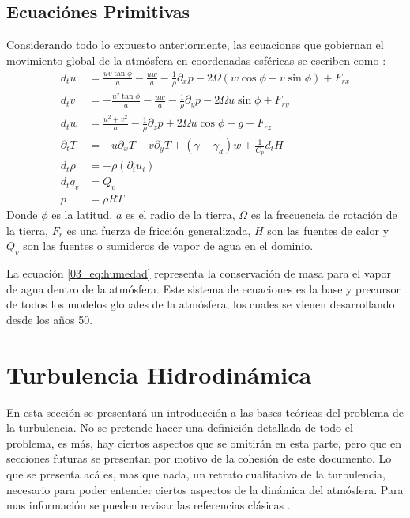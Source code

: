 \subsection{Ecuaciónes Primitivas}
Considerando todo lo expuesto anteriormente, las ecuaciones que gobiernan el movimiento global de la atmósfera en coordenadas esféricas se escriben como \cite{warner2010numerical}:
\begin{align}
d_t u &= \frac{uv\tan\phi}{a}-\frac{uw}{a}-\frac{1}{\rho}\partial_x p - 2\Omega(w\cos\phi - v\sin\phi) + F_{rx}\\
d_t v &= -\frac{u^2\tan\phi}{a}-\frac{uw}{a}-\frac{1}{\rho}\partial_y p - 2\Omega u\sin\phi + F_{ry}\\
d_t w &= \frac{u^2 + v^2}{a}-\frac{1}{\rho}\partial_z p + 2\Omega u\cos\phi -g + F_{rz}\\
\partial_t T &= -u\partial_x T -v\partial_y T + (\gamma-\gamma_d)w+\frac{1}{C_p}d_t H\\
d_t \rho &= -\rho(\partial_i u_i)\\
d_t q_v &= Q_v\label{03_eq:humedad}\\
p &= \rho R T
\end{align}
Donde $\phi$ es la latitud, $a$ es el radio de la tierra, $\Omega$ es la frecuencia de rotación de la tierra, $F_r$ es una fuerza de fricción generalizada, $H$ son las fuentes de calor y $Q_v$ son las fuentes o sumideros de vapor de agua en el dominio.

La ecuación \ref{03_eq:humedad} representa la conservación de masa para el vapor de agua dentro de la atmósfera. Este sistema de ecuaciones es la base y precursor de todos los modelos globales de la atmósfera, los cuales se vienen desarrollando desde los años 50.
\newpage
\section{Turbulencia Hidrodinámica}
En esta sección se presentará un introducción a las bases teóricas del problema de la turbulencia. No se pretende hacer una definición detallada de todo el problema, es más, hay ciertos aspectos que se omitirán en esta parte, pero que en secciones futuras se presentan por motivo de la cohesión de este documento. Lo que se presenta acá es, mas que nada, un retrato cualitativo de la turbulencia, necesario para poder entender ciertos aspectos de la dinámica del atmósfera. Para mas información se pueden revisar las referencias clásicas \cite{pope2000turbulent} \cite{davidson2013turbulence} \cite{9780521775380}.
